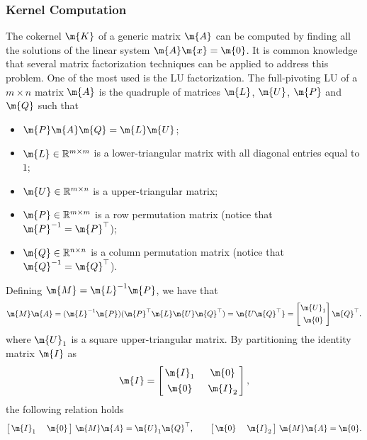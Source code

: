 \subsubsection{Kernel Computation}

The cokernel $\m{K}$ of a generic matrix $\m{A}$ can be computed by finding all the solutions of the linear system $\m{A}\m{x} = \m{0}$. It is common knowledge that several matrix factorization techniques can be applied to address this problem. One of the most used is the LU factorization. The full-pivoting LU  of a $m \times n$ matrix $\m{A}$ is the quadruple of matrices $\m{L}$, $\m{U}$, $\m{P}$ and $\m{Q}$ such that
%
\begin{itemize}
  \setlength{\itemsep}{0pt}
    \item $\m{P}\m{A}\m{Q} = \m{L}\m{U}$;
    \item $\m{L} \in \mathbb{R}^{m \times m}$ is a lower-triangular matrix with all diagonal entries equal to $1$;
    \item $\m{U} \in \mathbb{R}^{m \times n}$ is a upper-triangular matrix;
    \item $\m{P} \in \mathbb{R}^{m \times m}$ is a row permutation matrix (notice that $\m{P}^{-1} = \m{P}^\top$);
    \item $\m{Q} \in \mathbb{R}^{n \times n}$ is a column permutation matrix (notice that $\m{Q}^{-1} = \m{Q}^\top$).
\end{itemize}
%
Defining $\m{M} = \m{L}^{-1}\m{P}$, we have that
%
\begin{equation}
    \m{M}\m{A} = (\m{L}^{-1}\m{P})(\m{P}^\top\m{L}\m{U}\m{Q}^\top) = \m{U\m{Q}^\top} = \begin{bmatrix} \m{U}_1 \\[0.4em] \m{0} \end{bmatrix}\m{Q}^\top \text{.}
\end{equation}
%
where $\m{U}_1$ is a square upper-triangular matrix. By partitioning the identity matrix $\m{I}$ as
%
\begin{equation}
    \m{I} = \begin{bmatrix}
        \,\m{I}_1\, & \m{0} \\[0.4em]
        \m{0} & \,\m{I}_2\,
    \end{bmatrix} \text{,}
\end{equation}
%
the following relation holds
%
\begin{equation}
    \begin{bmatrix} \,\m{I}_1\, & \,\m{0}\, \end{bmatrix} \, \m{M}\m{A} = \m{U}_1 \m{Q}^\top
    \text{,} \qquad
    \begin{bmatrix} \,\m{0}\, & \,\m{I}_2\, \end{bmatrix} \, \m{M}\m{A} = \m{0} \text{.}
\end{equation}
